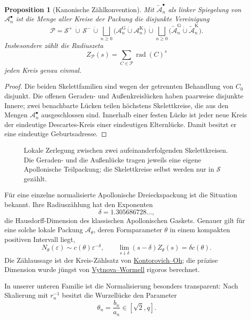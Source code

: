 \documentclass[11pt,a4paper]{article}
\newtheorem{proposition}[remark]{Proposition}
\begin{document}
\begin{proposition}[Kanonische Zählkonvention]
Mit $\widetilde{\mathcal A}_n^{\bullet}$ als linker Spiegelung von
$\mathcal A_n^{\bullet}$ ist die Menge aller Kreise der Packung die
disjunkte Vereinigung
\[
 \mathcal P=\mathcal S^+\,\dot\cup\,\mathcal S^-
 \,\dot\cup\!
 \bigsqcup_{n\ge0}\bigl(
 \mathcal A_n^{\mathrm{G}}\dot\cup\mathcal A_n^{\mathrm{K}}\bigr)
 \,\dot\cup\!
 \bigsqcup_{n\ge0}\bigl(
 \widetilde{\mathcal A}_n^{\mathrm{G}}
 \dot\cup\widetilde{\mathcal A}_n^{\mathrm{K}}\bigr).
\]
Insbesondere zählt die Radiuszeta
\[
 Z_{\mathcal P}(s)=\sum_{C\in\mathcal P}\operatorname{rad}(C)^s
\]
jeden Kreis genau einmal.
\end{proposition}

\begin{proof}
Die beiden Skelettfamilien sind wegen der getrennten Behandlung von $C_0$
disjunkt. Die offenen Geraden- und Außenkreislücken haben paarweise
disjunkte Innere; zwei benachbarte Lücken teilen höchstens Skelettkreise,
die aus den Mengen $\mathcal A_n^{\bullet}$ ausgeschlossen sind. Innerhalb
einer festen Lücke ist jeder neue Kreis der eindeutige Descartes-Kreis einer
eindeutigen Elternlücke. Damit besitzt er eine eindeutige Geburtsadresse.
\end{proof}

\begin{figure}[htbp]
 \centering
 
 \caption{Lokale Zerlegung zwischen zwei aufeinanderfolgenden
 Skelettkreisen. Die Geraden- und die Außenlücke tragen jeweils eine
 eigene Apollonische Teilpackung; die Skelettkreise selbst werden nur in
 $\mathcal S$ gezählt.}
 \label{fig:packing-decomposition}
\end{figure}

Für eine einzelne normalisierte Apollonische Dreieckspackung ist die
Situation bekannt. Ihre Radiuszählung hat den Exponenten
\[
 \delta=1.305686728\ldots,
\]
die Hausdorff-Dimension des klassischen Apollonischen Gaskets. Genauer gilt
für eine solche lokale Packung $\mathcal A_\theta$, deren Formparameter
$\theta$ in einem kompakten positiven Intervall liegt,
\[
 N_\theta(\varepsilon)
 \sim c(\theta)\varepsilon^{-\delta},
 \qquad
 \lim_{s\downarrow\delta}(s-\delta)Z_\theta(s)
 =\delta c(\theta).
\]
Die Zählaussage ist der Kreis-Zählsatz von
\href{https://arxiv.org/abs/0811.2236}{Kontorovich--Oh}; die präzise
Dimension wurde jüngst von
\href{https://arxiv.org/abs/2406.04922}{Vytnova--Wormell} rigoros
berechnet.

In unserer unteren Familie ist die Normalisierung besonders transparent:
Nach Skalierung mit $r_n^{-1}$ besitzt die Wurzellücke den Parameter
\[
 \theta_n=\frac{b_n}{a_n}\in[\sqrt2,q].
\]
\end{document}
